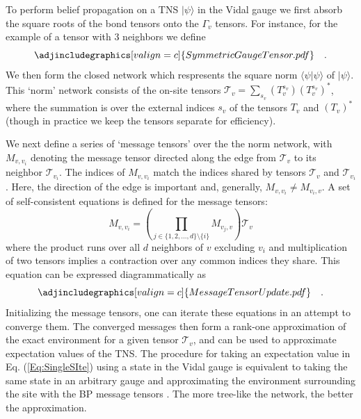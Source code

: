 \documentclass[%
 superscriptaddress,
 amsmath,amssymb,
 prx, nofootinbib,
 twocolumn
]{revtex4-2}
\begin{document}
To perform belief propagation on a TNS $\vert \psi \rangle$ in the Vidal gauge we first absorb the square roots of the bond tensors onto the $\Gamma_{v}$ tensors. For instance, for the example of a tensor with $3$ neighbors we define
\begin{equation}
    \adjincludegraphics[valign=c]{SymmetricGaugeTensor.pdf} \quad.
    \label{Eq:SymmetricTensor}
\end{equation}
We then form the closed network which respresents the square norm $\langle \psi \vert \psi \rangle$ of $\vert \psi \rangle$. This `norm' network consists of the on-site tensors $\mathcal{T}_{v} = \sum_{s_v} (T^{s_v}_{v})(T^{s_v}_{v})^*$, where the summation is over the external indices $s_{v}$ of the tensors $T_{v}$ and $\left( T_{v} \right)^{*}$ (though in practice we keep the tensors separate for efficiency). 

We next define a series of `message tensors' over the the norm network, with $M_{v, v_{i}}$ denoting the message tensor directed along the edge from $\mathcal{T}_{v}$ to its neighbor $\mathcal{T}_{v_{i}}$. The indices of $M_{v, v_{i}}$ match the indices shared by tensors $\mathcal{T}_{v}$ and $\mathcal{T}_{v_{i}}$. Here, the direction of the edge is important and, generally, $M_{v,v_{i}} \neq  M_{v_{i},v}$.
A set of self-consistent equations is defined for the message tensors:
\begin{equation}
    M_{v, v_{i}} = \left(\prod_{j \in \{1, 2, ..., d \} \setminus \{i \}}M_{v_{j}, v}\right)\mathcal{T}_{v}
    \label{Eq:MessageTensorSelfConsistency}
\end{equation}
where the product runs over all $d$ neighbors of $v$ excluding $v_{i}$ and multiplication of two tensors implies a contraction over any common indices they share.
This equation can be expressed diagrammatically as
\begin{equation}
    \adjincludegraphics[valign=c]{MessageTensorUpdate.pdf} \quad.
    \label{Eq:BPEquation}
\end{equation}
Initializing the message tensors, one can iterate these equations in an attempt to converge them. The converged messages then form a rank-one approximation of the exact environment for a given tensor $\mathcal{T}_{v}$, and can be used to approximate expectation values of the TNS. The procedure for taking an expectation value in Eq. (\ref{Eq:SingleSIte}) using a state in the Vidal gauge is equivalent to taking the same state in an arbitrary gauge and approximating the environment surrounding the site with the BP message tensors \cite{Alkabetz2021, TindallGauging2023}. The more tree-like the network, the better the approximation. 
\end{document}
